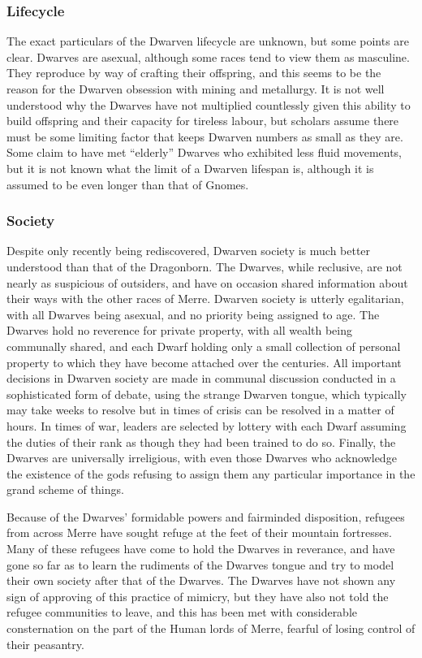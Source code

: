 \documentclass[paper=a4, fontsize=11pt]{scrartcl} %
\begin{document}
\begin{multicols}{2}
\subsubsection{Lifecycle}

The exact particulars of the Dwarven lifecycle are unknown, but some points are clear. Dwarves are asexual, although some races tend to view them as masculine. They reproduce by way of crafting their offspring, and this seems to be the reason for the Dwarven obsession with mining and metallurgy. It is not well understood why the Dwarves have not multiplied countlessly given this ability to build offspring and their capacity for tireless labour, but scholars assume there must be some limiting factor that keeps Dwarven numbers as small as they are. Some claim to have met ``elderly'' Dwarves who exhibited less fluid movements, but it is not known what the limit of a Dwarven lifespan is, although it is assumed to be even longer than that of Gnomes.

\subsubsection{Society}

Despite only recently being rediscovered, Dwarven society is much better understood than that of the Dragonborn. The Dwarves, while reclusive, are not nearly as suspicious of outsiders, and have on occasion shared information about their ways with the other races of Merre. Dwarven society is utterly egalitarian, with all Dwarves being asexual, and no priority being assigned to age. The Dwarves hold no reverence for private property, with all wealth being communally shared, and each Dwarf holding only a small collection of personal property to which they have become attached over the centuries. All important decisions in Dwarven society are made in communal discussion conducted in a sophisticated form of debate, using the strange Dwarven tongue, which typically may take weeks to resolve but in times of crisis can be resolved in a matter of hours. In times of war, leaders are selected by lottery with each Dwarf assuming the duties of their rank as though they had been trained to do so. Finally, the Dwarves are universally irreligious, with even those Dwarves who acknowledge the existence of the gods refusing to assign them any particular importance in the grand scheme of things.

Because of the Dwarves' formidable powers and fairminded disposition, refugees from across Merre have sought refuge at the feet of their mountain fortresses. Many of these refugees have come to hold the Dwarves in reverance, and have gone so far as to learn the rudiments of the Dwarves tongue and try to model their own society after that of the Dwarves. The Dwarves have not shown any sign of approving of this practice of mimicry, but they have also not told the refugee communities to leave, and this has been met with considerable consternation on the part of the Human lords of Merre, fearful of losing control of their peasantry.


\end{multicols}
\end{document}
